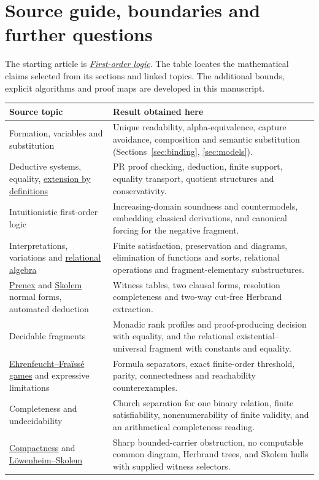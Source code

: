 \clearpage
\section{Source guide, boundaries and further questions}
\begingroup\small
The starting article is \href{https://en.wikipedia.org/wiki/First-order_logic}{\emph{First-order logic}}. The table locates the mathematical claims selected from its sections and linked topics. The additional bounds, explicit algorithms and proof maps are developed in this manuscript.

\begin{center}\small
\begin{tabularx}{\linewidth}{@{}>{\raggedright\arraybackslash}p{.32\linewidth}>{\raggedright\arraybackslash}X@{}}\toprule
Source topic & Result obtained here \\ \midrule
Formation, variables and substitution & Unique readability, alpha-equivalence, capture avoidance, composition and semantic substitution (Sections~\ref{sec:binding}, \ref{sec:models}).\\
Deductive systems, equality, \href{https://en.wikipedia.org/wiki/Extension_by_definitions}{extension by definitions} & PR proof checking, deduction, finite support, equality transport, quotient structures and conservativity.\\
Intuitionistic first-order logic & Increasing-domain soundness and countermodels, embedding classical derivations, and canonical forcing for the negative fragment.\\
Interpretations, variations and \href{https://en.wikipedia.org/wiki/Relational_algebra}{relational algebra} & Finite satisfaction, preservation and diagrams, elimination of functions and sorts, relational operations and fragment-elementary substructures.\\
\href{https://en.wikipedia.org/wiki/Prenex_normal_form}{Prenex} and \href{https://en.wikipedia.org/wiki/Skolem_normal_form}{Skolem} normal forms, automated deduction & Witness tables, two clausal forms, resolution completeness and two-way cut-free Herbrand extraction.\\
Decidable fragments & Monadic rank profiles and proof-producing decision with equality, and the relational existential--universal fragment with constants and equality.\\
\href{https://en.wikipedia.org/wiki/Ehrenfeucht-Fraisse_game}{Ehrenfeucht--Fraïssé games} and expressive limitations & Formula separators, exact finite-order threshold, parity, connectedness and reachability counterexamples.\\
Completeness and undecidability & Church separation for one binary relation, finite satisfiability, nonenumerability of finite validity, and an arithmetical completeness reading.\\
\href{https://en.wikipedia.org/wiki/Compactness_theorem}{Compactness} and \href{https://en.wikipedia.org/wiki/Lowenheim-Skolem_theorem}{Löwenheim--Skolem} & Sharp bounded-carrier obstruction, no computable common diagram, Herbrand trees, and Skolem hulls with supplied witness selectors.\\
\bottomrule\end{tabularx}\end{center}

